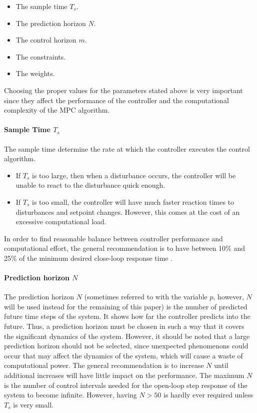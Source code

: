 \documentclass{thesisreport}
\begin{document}
\begin{itemize}
	\item The sample time $T_s$.
	\item The prediction horizon $N$.
	\item The control horizon $m$.
	\item The constraints.
	\item The weights.
\end{itemize}

\noindent Choosing the proper values for the parameters stated above is very important since they affect the performance of the controller and the computational complexity of the MPC algorithm.

\paragraph{Sample Time $T_s$} 

The sample time determine the rate at which the controller executes the control algorithm. \begin{itemize}
	\item If $T_s$ is too large, then when a disturbance occurs, the controller will be unable to react to the disturbance quick enough.
	\item If $T_s$ is too small, the controller will have much faster reaction times to disturbances and setpoint changes. However, this comes at the cost of an excessive computational load.
\end{itemize}

\noindent In order to find reasonable balance between controller performance and computational effort, the general recommendation is to have between 10\% and 25\% of the minimum desired close-loop response time .

\paragraph{Prediction horizon $N$} 

The prediction horizon $N$ (sometimes referred to with the variable $p$, however, $N$ will be used instead for the remaining of this paper) is the number of predicted future time steps of the system. It shows how far the controller predicts into the future. Thus, a prediction horizon must be chosen in such a way that it covers the significant dynamics of the system. However, it should be noted that a large prediction horizon should not be selected, since unexpected phenomenons could occur that may affect the dynamics of the system, which will cause a waste of computational power. The general recommendation is to increase $N$ until additional increases will have little impact on the performance. The maximum $N$ is the number of control intervals needed for the open-loop step response of the system to become infinite. However, having $N>50$ is hardly ever required unless $T_s$ is very small.
\end{document}
